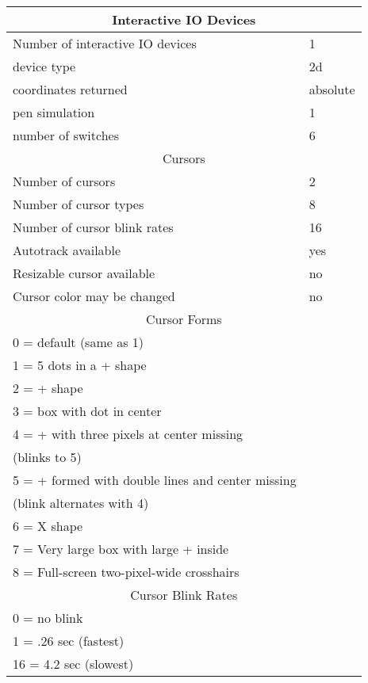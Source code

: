 \begin{tabular}{|l l|}
\hline 
\multicolumn{2}{|c|}{Interactive IO Devices}\\ 
\hline
Number of interactive IO devices & 1\\
device type & 2d\\
coordinates returned & absolute\\
pen simulation & 1\\
number of switches & 6\\
\hline \hline 
\multicolumn{2}{|c|}{Cursors}\\ 
\hline
Number of cursors & 2\\
Number of cursor types & 8\\
Number of cursor blink rates & 16\\
Autotrack available & yes\\
Resizable cursor available & no\\
Cursor color may be changed & no\\
\hline \hline 
\multicolumn{2}{|c|}{Cursor Forms}\\
\hline
0 = default (same as 1) & \\
1 = 5 dots in a + shape & \\
2 = + shape & \\
3 = box with dot in center & \\
4 = + with three pixels at center missing & \\
(blinks to 5) & \\
5 = + formed with double lines and center missing & \\
(blink alternates with 4) & \\
6 = X shape & \\
7 = Very large box with large + inside & \\
8 = Full-screen two-pixel-wide crosshairs & \\ 
\hline \hline 
\multicolumn{2}{|c|}{Cursor Blink Rates}\\
\hline
0 = no blink & \\
1 = .26 sec (fastest) & \\
16 = 4.2 sec (slowest) & \\ \hline
\end{tabular}
\newpage
